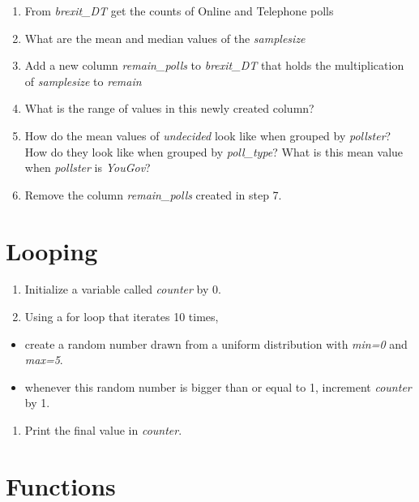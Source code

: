 \documentclass[]{article}
\providecommand{\tightlist}{%
  \setlength{\itemsep}{0pt}\setlength{\parskip}{0pt}}
\begin{document}
\begin{enumerate}
\def\labelenumi{\arabic{enumi})}
\setcounter{enumi}{4}
\item
  From \emph{brexit\_DT} get the counts of Online and Telephone polls
\item
  What are the mean and median values of the \emph{samplesize}
\item
  Add a new column \emph{remain\_polls} to \emph{brexit\_DT} that holds the multiplication of \emph{samplesize} to \emph{remain}
\item
  What is the range of values in this newly created column?
\item
  How do the mean values of \emph{undecided} look like when grouped by \emph{pollster}? How do they look like when grouped by \emph{poll\_type}? What is this mean value when \emph{pollster} is \emph{YouGov}?
\item
  Remove the column \emph{remain\_polls} created in step 7.
\end{enumerate}

\hypertarget{looping}{%
\section{Looping}\label{looping}}

\begin{enumerate}
\def\labelenumi{\arabic{enumi})}
\tightlist
\item
  Initialize a variable called \emph{counter} by 0.
\item
  Using a for loop that iterates 10 times,
\end{enumerate}

\begin{itemize}
\tightlist
\item
  create a random number drawn from a uniform distribution with \emph{min=0} and \emph{max=5}.
\item
  whenever this random number is bigger than or equal to 1, increment \emph{counter} by 1.
\end{itemize}

\begin{enumerate}
\def\labelenumi{\arabic{enumi})}
\setcounter{enumi}{2}
\tightlist
\item
  Print the final value in \emph{counter}.
\end{enumerate}

\hypertarget{functions}{%
\section{Functions}\label{functions}}
\end{document}
